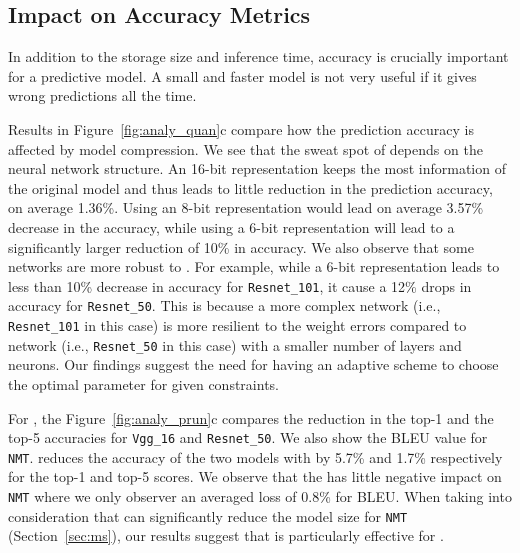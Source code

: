\subsection{Impact on Accuracy Metrics}
In addition to the storage size and inference time, accuracy is crucially important for a predictive model. A small and faster model is not
very useful if it gives wrong predictions all the time.


Results in Figure~\ref{fig:analy_quan}c compare how the prediction accuracy is affected by model compression. We see that the sweat spot of
\quantization depends on the neural network structure. An 16-bit representation keeps the most information of the original model and thus
leads to little reduction in the prediction accuracy, on average  1.36\%.  Using an 8-bit representation would lead on average 3.57\%
decrease in the accuracy, while using a 6-bit representation will lead to a significantly larger reduction of 10\% in  accuracy. We also
observe that some networks are more robust to \quantization. For example, while a 6-bit representation leads to less than 10\% decrease in
accuracy for \texttt{Resnet\_101}, it cause a 12\% drops in accuracy for \texttt{Resnet\_50}. This is because a more complex network (i.e.,
\texttt{Resnet\_101} in this case) is more resilient to the weight errors compared to network (i.e., \texttt{Resnet\_50} in this case) with
a smaller number of layers and neurons. Our findings suggest the need for having an adaptive scheme to choose the optimal \dquantization
parameter for given constraints.


For \pruning, the Figure~\ref{fig:analy_prun}c compares the reduction in the top-1 and the top-5 accuracies for \texttt{Vgg\_16} and
\texttt{Resnet\_50}. We also show the BLEU value for \texttt{NMT}. \pruning reduces the accuracy of the two \CNN models with by 5.7\% and
1.7\% respectively for the top-1 and top-5 scores. We observe that the \pruning has little negative impact on \texttt{NMT} where we only
observer an averaged loss of 0.8\% for BLEU. When taking into consideration that \pruning can significantly reduce the model size for
\texttt{NMT} (Section~\ref{sec:ms}), our results suggest that \pruning is particularly effective for \RNNs.





